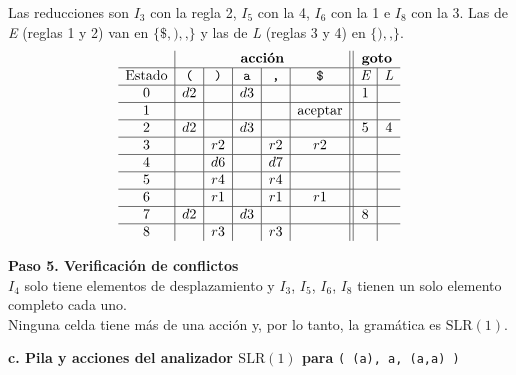 \documentclass[12pt,letterpaper]{article}
\newcommand{\nt}[1]{\textit{#1}}
\newcommand{\tk}[1]{\texttt{#1}}
\newcommand{\slr}{\mathrm{SLR(1)}}
\begin{document}
\begin{enumerate}[label=\arabic*.]
  Las reducciones son $I_3$ con la regla 2, $I_5$ con la 4, $I_6$ con la 1 e $I_8$ con la 3. Las de \nt{E}
  (reglas 1 y 2) van en $\{\tk{\$},\tk{)},\tk{,}\}$ y las de \nt{L} (reglas 3 y 4) en $\{\tk{)},\tk{,}\}$.
  \[
  \begin{array}{c|c|c|c|c|c||c|c}
    & \multicolumn{5}{c||}{\textbf{acción}} & \multicolumn{2}{c}{\textbf{goto}} \\ \hline
    \text{Estado} & \tk{(} & \tk{)} & \tk{a} & \tk{,} & \tk{\$} & \nt{E} & \nt{L} \\ \hline
    0 & d2 &    & d3 &    &    & 1 &   \\ \hline
    1 &    &    &    &    & \text{aceptar} &   &   \\ \hline
    2 & d2 &    & d3 &    &    & 5 & 4 \\ \hline
    3 &    & r2 &    & r2 & r2 &   &   \\ \hline
    4 &    & d6 &    & d7 &    &   &   \\ \hline
    5 &    & r4 &    & r4 &    &   &   \\ \hline
    6 &    & r1 &    & r1 & r1 &   &   \\ \hline
    7 & d2 &    & d3 &    &    & 8 &   \\ \hline
    8 &    & r3 &    & r3 &    &   &   \\
  \end{array}
  \]

  \textbf{Paso 5. Verificación de conflictos}\\
  $I_4$ solo tiene elementos de desplazamiento y $I_3$, $I_5$, $I_6$, $I_8$ tienen un solo elemento completo cada
  uno.\\

  Ninguna celda tiene más de una acción y, por lo tanto, la gramática es $\slr$.

  \bigskip

  \textbf{\large c. Pila y acciones del analizador $\slr$ para} \tk{(\,(a),\,a,\,(a,a)\,)}\\


\end{enumerate}
\end{document}
